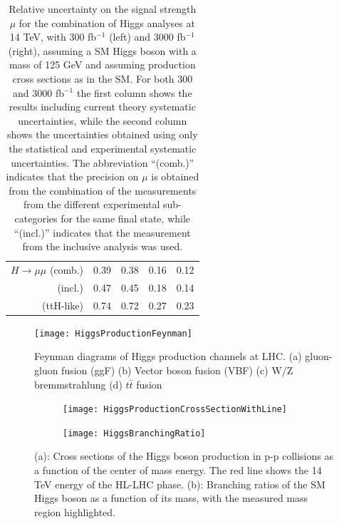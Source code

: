 \documentclass[a4paper,twoside,12pt]{book}
\begin{document}
\begin{table} [h]
{\begin{tabu}{| r | c | c | c | c |}
$H \rightarrow \mu\mu$ (comb.) & 0.39 & 0.38 & 0.16 & 0.12 \\
(incl.) & 0.47 & 0.45 & 0.18 & 0.14 \\
(ttH-like) & 0.74 & 0.72 & 0.27 & 0.23 \\ \hline            
       	\end{tabu}}
	\caption{Relative uncertainty on the signal strength $\mu$ for the combination of Higgs analyses at 14 TeV,
with 300 fb$^{-1}$ (left) and 3000 fb$^{-1}$ (right), assuming a SM Higgs boson with a mass of 125 GeV and
assuming production cross sections as in the SM. For both 300 and 3000 fb$^{-1}$ the first column shows
the results including current theory systematic uncertainties, while the second column shows the uncertainties obtained using only the statistical and experimental systematic uncertainties. The abbreviation
“(comb.)” indicates that the precision on $\mu$ is obtained from the combination of the measurements from
the different experimental sub-categories for the same final state, while “(incl.)” indicates that the measurement from the inclusive analysis was used\cite{higgsCouplings}.}
	\label{tab:HiggsTable}
	\end{table}

\begin{figure} [h]
	\centering
	\texttt{[image: HiggsProductionFeynman]}
	\caption{Feynman diagrams of Higgs production channels at LHC\cite{HiggsFeynman}. (a) gluon-gluon fusion (ggF) (b) Vector boson fusion (VBF) (c) W/Z bremmstrahlung (d) $t\bar{t}$ fusion}
	\label{fig:HiggsProductionFeynman}
\end{figure}


\begin{figure}
\centering
\begin{subfigure}{.5\textwidth}
  \centering
  \texttt{[image: HiggsProductionCrossSectionWithLine]}
  \caption{}
  \label{fig:HiggsProductionCrossSection}
\end{subfigure}%
\begin{subfigure}{.5\textwidth}
  \centering
  \texttt{[image: HiggsBranchingRatio]}
  \caption{}
  \label{fig:HiggsBranchingRatio}
\end{subfigure}
\caption{(a): Cross sections of the Higgs boson production in p-p collisions as a function of the center of mass energy\cite{HiggsCrossSections}. The red line
shows the 14 TeV energy of the HL-LHC phase. (b): Branching
ratios of the SM Higgs boson as a function of its mass, with the measured mass region highlighted\cite{HiggsCrossSections}.}
\label{fig:test}\end{figure}
\end{document}
